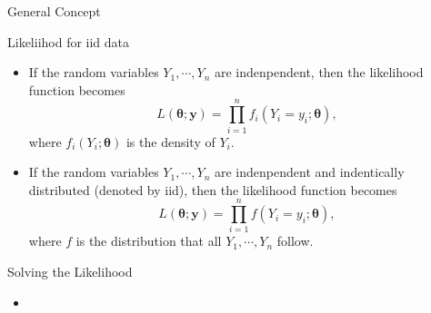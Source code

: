 \documentclass{beamer}
\begin{document}
\begin{section}{General Concept}
    \begin{frame}{Likeliihod for iid data}
        \begin{itemize}
            \item If the random variables $Y_{1}, \cdots, Y_{n}$ are indenpendent, then the likelihood function becomes 
$$L(\boldsymbol{\theta}; \mathbf{y}) = \prod^{n}_{i=1}f_{i}(Y_{i} = y_{i};\boldsymbol{\theta}),$$
where $f_{i}(Y_{i}; \boldsymbol{\theta})$ is the density of $Y_{i}.$
             \item If the  random variables $Y_{1}, \cdots, Y_{n}$ are indenpendent  and indentically distributed (denoted by iid), then the likelihood function becomes 
$$L(\boldsymbol{\theta}; \mathbf{y}) = \prod^{n}_{i=1}f(Y_{i} = y_{i};\boldsymbol{\theta}),$$
where $f$ is the distribution that all $Y_{1}, \cdots, Y_{n}$ follow.
        \end{itemize}
    \end{frame}


    \begin{frame}{Solving the Likelihood}
        \begin{itemize}
            \item 
        \end{itemize}
    \end{frame}
 \end{section}
\end{document}

